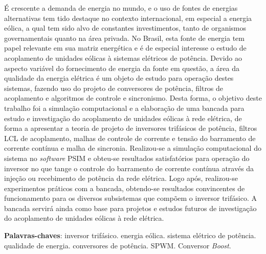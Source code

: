 \begin{resumo}
 
É crescente a demanda de energia no mundo, e o uso de fontes de energias alternativas tem tido destaque no contexto 
internacional, em especial a energia eólica, a qual tem sido alvo de constantes investimentos, tanto de organismos 
governamentais quanto na área privada. No Brasil, esta fonte de energia tem papel relevante em sua matriz energética e 
é de especial interesse o estudo de acoplamento de unidades eólicas à sistemas elétricos de potência. 
Devido ao aspecto variável do fornecimento de energia da fonte em questão, a área da qualidade da energia elétrica 
é um objeto de estudo para operação destes sistemas, fazendo uso do projeto de conversores de potência, filtros de 
acoplamento e algoritmos de controle e sincronismo. Desta forma, o objetivo deste trabalho foi a simulação computacional 
e a elaboração de uma bancada para estudo e investigação do acoplamento de unidades eólicas à rede elétrica, de forma 
a apresentar a teoria de projeto de inversores trifásicos de potência, filtros LCL de acoplamento, 
malhas de controle de corrente e tensão do barramento de corrente contínua e malha de sincronia. Realizou-se a 
simulação computacional do sistema no \textit{software} PSIM e obteu-se resultados satisfatórios para operação 
do inversor no que tange o controle do barramento de corrente contínua através da injeção ou recebimento de potência da 
rede elétrica. Logo após, realizou-se experimentos práticos com a bancada, obtendo-se resultados 
convincentes de funcionamento para os diversos subsistemas que compõem o inversor trifásico. 
A bancada servirá ainda como base para projetos e estudos futuros de investigação do acoplamento 
de unidades eólicas à rede elétrica.


 \vspace{\onelineskip}
    
 \noindent
 \textbf{Palavras-chaves}: inversor trifásico. energia eólica. sistema elétrico de potência. qualidade de energia. conversores de potência. SPWM. Conversor \textit{Boost}.
\end{resumo}
